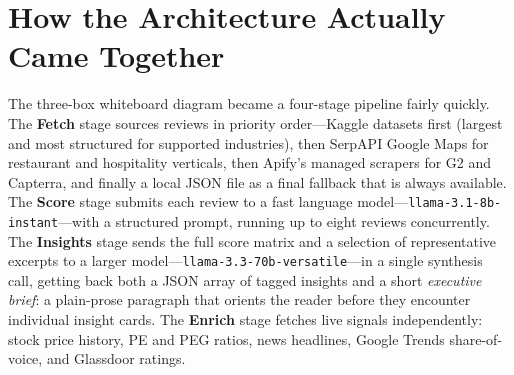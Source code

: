\documentclass[9pt, a4paper, twocolumn]{article}
\begin{document}
\section{How the Architecture Actually Came Together}

The three-box whiteboard diagram became a four-stage pipeline fairly quickly. The \textbf{Fetch} stage sources reviews in priority order---Kaggle datasets first (largest and most structured for supported industries), then SerpAPI Google Maps for restaurant and hospitality verticals, then Apify's managed scrapers for G2 and Capterra, and finally a local JSON file as a final fallback that is always available. The \textbf{Score} stage submits each review to a fast language model---\texttt{llama-3.1-8b-instant}---with a structured prompt, running up to eight reviews concurrently. The \textbf{Insights} stage sends the full score matrix and a selection of representative excerpts to a larger model---\texttt{llama-3.3-70b-versatile}---in a single synthesis call, getting back both a JSON array of tagged insights and a short \textit{executive brief}: a plain-prose paragraph that orients the reader before they encounter individual insight cards. The \textbf{Enrich} stage fetches live signals independently: stock price history, PE and PEG ratios, news headlines, Google Trends share-of-voice, and Glassdoor ratings.
\end{document}
